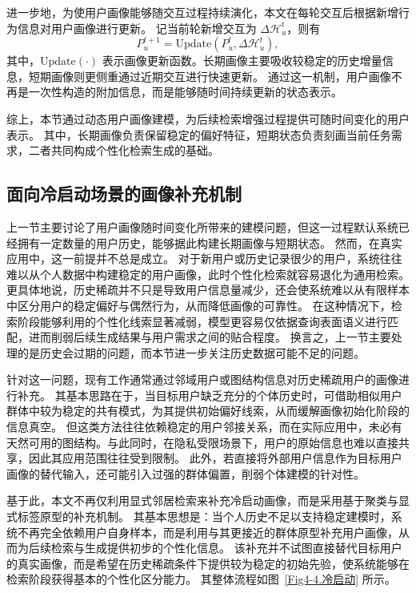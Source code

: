进一步地，为使用户画像能够随交互过程持续演化，本文在每轮交互后根据新增行为信息对用户画像进行更新。
记当前轮新增交互为 $\Delta \mathcal{H}_u^t$，则有
\begin{equation}
P_u^{t+1}=\mathrm{Update}\!\left(P_u^t,\Delta \mathcal{H}_u^t\right),
\end{equation}
其中，$\mathrm{Update}(\cdot)$ 表示画像更新函数。长期画像主要吸收较稳定的历史增量信息，短期画像则更侧重通过近期交互进行快速更新。
通过这一机制，用户画像不再是一次性构造的附加信息，而是能够随时间持续更新的状态表示。

综上，本节通过动态用户画像建模，为后续检索增强过程提供可随时间变化的用户表示。
其中，长期画像负责保留稳定的偏好特征，短期状态负责刻画当前任务需求，二者共同构成个性化检索生成的基础。

\subsection{面向冷启动场景的画像补充机制}

上一节主要讨论了用户画像随时间变化所带来的建模问题，但这一过程默认系统已经拥有一定数量的用户历史，能够据此构建长期画像与短期状态。
然而，在真实应用中，这一前提并不总是成立。
对于新用户或历史记录很少的用户，系统往往难以从个人数据中构建稳定的用户画像，此时个性化检索就容易退化为通用检索。
更具体地说，历史稀疏并不只是导致用户信息量减少，还会使系统难以从有限样本中区分用户的稳定偏好与偶然行为，从而降低画像的可靠性。
在这种情况下，检索阶段能够利用的个性化线索显著减弱，模型更容易仅依据查询表面语义进行匹配，进而削弱后续生成结果与用户需求之间的贴合程度。
换言之，上一节主要处理的是历史会过期的问题，而本节进一步关注历史数据可能不足的问题。

针对这一问题，现有工作通常通过邻域用户或图结构信息对历史稀疏用户的画像进行补充\cite{auPersonalizedGraphBasedRetrieval2025}。
其基本思路在于，当目标用户缺乏充分的个体历史时，可借助相似用户群体中较为稳定的共有模式，为其提供初始偏好线索，从而缓解画像初始化阶段的信息真空。
但这类方法往往依赖稳定的用户邻接关系，而在实际应用中，未必有天然可用的图结构。与此同时，在隐私受限场景下，用户的原始信息也难以直接共享，因此其应用范围往往受到限制。
此外，若直接将外部用户信息作为目标用户画像的替代输入，还可能引入过强的群体偏置，削弱个体建模的针对性。

基于此，本文不再仅利用显式邻居检索来补充冷启动画像，而是采用基于聚类与显式标签原型的补充机制。
其基本思想是：当个人历史不足以支持稳定建模时，系统不再完全依赖用户自身样本，而是利用与其更接近的群体原型补充用户画像，从而为后续检索与生成提供初步的个性化信息。
该补充并不试图直接替代目标用户的真实画像，而是希望在历史稀疏条件下提供较为稳定的初始先验，使系统能够在检索阶段获得基本的个性化区分能力。
其整体流程如图~\ref{Fig4-4.冷启动} 所示。

